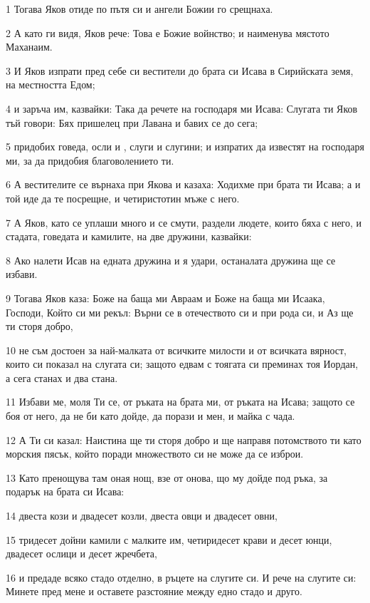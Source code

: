 \par 1 Тогава Яков отиде по пътя си и ангели Божии го срещнаха.
\par 2 А като ги видя, Яков рече: Това е Божие войнство; и наименува мястото Маханаим.
\par 3 И Яков изпрати пред себе си вестители до брата си Исава в Сирийската земя, на местността Едом;
\par 4 и заръча им, казвайки: Така да речете на господаря ми Исава: Слугата ти Яков тъй говори: Бях пришелец при Лавана и бавих се до сега;
\par 5 придобих говеда, осли и , слуги и слугини; и изпратих да известят на господаря ми, за да придобия благоволението ти.
\par 6 А вестителите се върнаха при Якова и казаха: Ходихме при брата ти Исава; а и той иде да те посрещне, и четиристотин мъже с него.
\par 7 А Яков, като се уплаши много и се смути, раздели людете, които бяха с него, и стадата, говедата и камилите, на две дружини, казвайки:
\par 8 Ако налети Исав на едната дружина и я удари, останалата дружина ще се избави.
\par 9 Тогава Яков каза: Боже на баща ми Авраам и Боже на баща ми Исаака, Господи, Който си ми рекъл: Върни се в отечеството си и при рода си, и Аз ще ти сторя добро,
\par 10 не съм достоен за най-малката от всичките милости и от всичката вярност, които си показал на слугата си; защото едвам с тоягата си преминах тоя Иордан, а сега станах и два стана.
\par 11 Избави ме, моля Ти се, от ръката на брата ми, от ръката на Исава; защото се боя от него, да не би като дойде, да порази и мен, и майка с чада.
\par 12 А Ти си казал: Наистина ще ти сторя добро и ще направя потомството ти като морския пясък, който поради множеството си не може да се изброи.
\par 13 Като пренощува там оная нощ, взе от онова, що му дойде под ръка, за подарък на брата си Исава:
\par 14 двеста кози и двадесет козли, двеста овци и двадесет овни,
\par 15 тридесет дойни камили с малките им, четиридесет крави и десет юнци, двадесет ослици и десет жречбета,
\par 16 и предаде всяко стадо отделно, в ръцете на слугите си. И рече на слугите си: Минете пред мене и оставете разстояние между едно стадо и друго.
